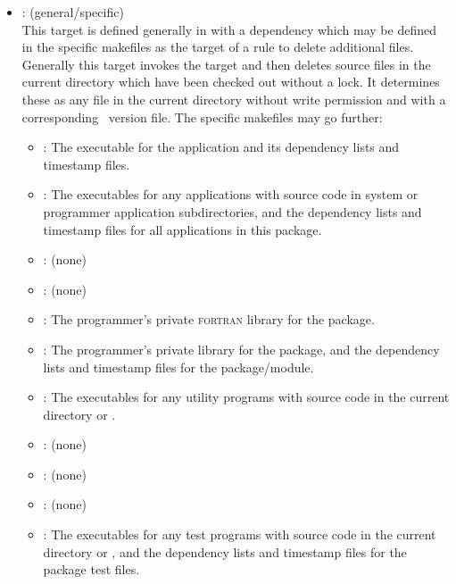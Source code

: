 \begin{itemize}
\item
    : (general/specific)
   \\ This target is defined generally in  with a dependency
   which may be defined in the specific makefiles as the target of a rule to
   delete additional files.  Generally this target invokes the 
   target and then deletes source files in the current directory which have
   been checked out without a lock.  It determines these as any file in the
   current directory without write permission and with a corresponding
   \rcs\ version file.  The specific makefiles may go further:
   \begin{itemize}
   \item
      : The executable for the application and its dependency lists
      and timestamp files.
   \item
      : The executables for any applications with source code in
      system or programmer application subdirectories, and the dependency
      lists and timestamp files for all applications in this package.
   \item
      : (none)
   \item
      : (none)
   \item
      : The programmer's private \textsc{fortran} library for the
      package.
   \item
      : The programmer's private  library for the
      package, and the dependency lists and timestamp files for the
      package/module.
   \item
      : The executables for any utility programs with source code in
      the current directory or .
   \item
      : (none)
   \item
      : (none)
   \item
      : (none)
   \item
      : The executables for any test programs with source code in
      the current directory or , and the dependency lists
      and timestamp files for the package test files.
   \end{itemize}


\end{itemize}

